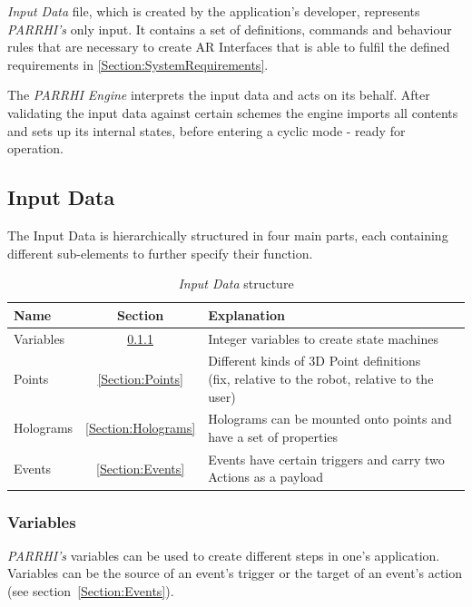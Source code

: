 \textit{Input Data} file, which is created by the application's developer, represents \textit{PARRHI's} only input. It contains a set of definitions, commands and behaviour rules that are necessary to create AR Interfaces that is able to fulfil the defined requirements in \ref{Section:SystemRequirements}.

The \textit{PARRHI Engine} interprets the input data and acts on its behalf. After validating the input data against certain schemes the engine imports all contents and sets up its internal states, before entering a cyclic mode - ready for operation.

\clearpage
\subsection{Input Data}

The Input Data is hierarchically structured in four main parts, each containing different sub-elements to further specify their function. 

\begin{table}[ht]
	\caption{\textit{Input Data} structure}
	\label{Tab:InputDataStructure}
	\centering
	\begin{tabular}{lcl}
		\toprule
		Name & Section		& Explanation	\\		
		\midrule
		Variables & \ref{Section:Variables}		& Integer variables to create state machines \\
		Points& \ref{Section:Points}		& \parbox[t]{10cm}{Different kinds of 3D Point definitions\\(fix, relative to the robot, relative to the user)} 	 \\
		Holograms& \ref{Section:Holograms} & Holograms can be mounted onto points and have a set of properties\\
		Events& \ref{Section:Events} & Events have certain triggers and carry two Actions as a payload \\
		\bottomrule
	\end{tabular}
\end{table}

\subsubsection{Variables}\label{Section:Variables}
\textit{PARRHI's} variables can be used to create different steps in one's application. Variables can be the source of an event's trigger or the target of an event's action (see section~\ref{Section:Events}).

